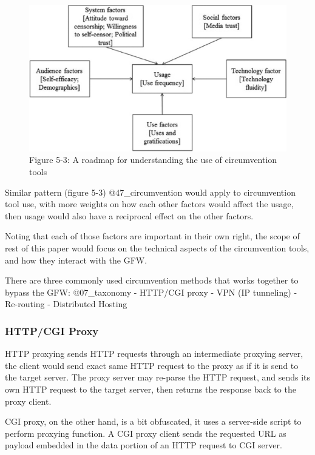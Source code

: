 \begin{figure}
\centering
\includegraphics{./res/5.3-circumventAdopt.png}
\caption{Figure 5-3: A roadmap for understanding the use of
circumvention tools}
\end{figure}

Similar pattern (figure 5-3) @47\_circumvention would apply to
circumvention tool use, with more weights on how each other factors
would affect the usage, then usage would also have a reciprocal effect
on the other factors.

Noting that each of those factors are important in their own right, the
scope of rest of this paper would focus on the technical aspects of the
circumvention tools, and how they interact with the GFW.

There are three commonly used circumvention methods that works together
to bypass the GFW: @07\_taxonomy - HTTP/CGI proxy - VPN (IP tunneling) -
Re-routing - Distributed Hosting

\hypertarget{httpcgi-proxy}{%
\subsubsection{HTTP/CGI Proxy}\label{httpcgi-proxy}}

HTTP proxying sends HTTP requests through an intermediate proxying
server, the client would send exact same HTTP request to the proxy as if
it is send to the target server. The proxy server may re-parse the HTTP
request, and sends its own HTTP request to the target server, then
returns the response back to the proxy client.

CGI proxy, on the other hand, is a bit obfuscated, it uses a server-side
script to perform proxying function. A CGI proxy client sends the
requested URL as payload embedded in the data portion of an HTTP request
to CGI server.

